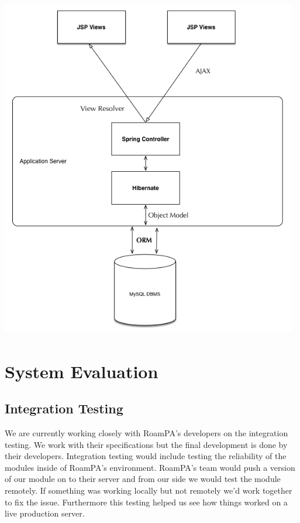 \begin{center}    
	\includegraphics[height=15cm, width=13cm]{img/architecture.png}
\end{center}

\chapter{System Evaluation}

\section{Integration Testing}

We are currently working closely with RoamPA's developers on the integration testing. We work with their specifications but the final development is done by their developers. Integration testing would include testing the reliability of the modules inside of RoamPA's environment. RoamPA's team would push a version of our module on to their server and from our side we would test the module remotely. If something was working locally but not remotely we'd work together to fix the issue. Furthermore this testing helped us see how things worked on a live production server.

